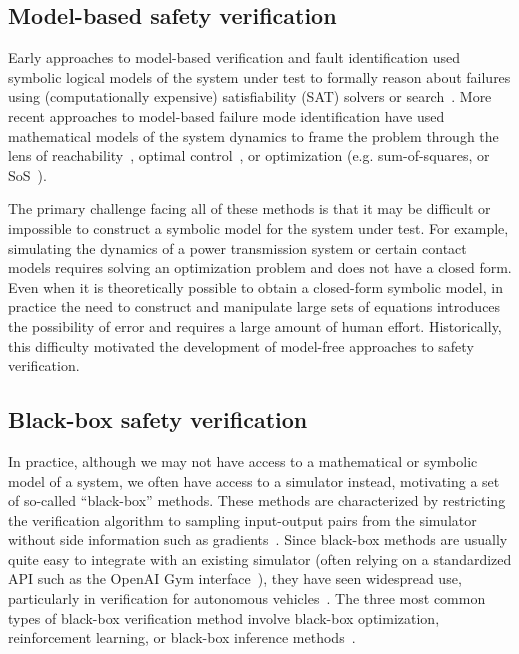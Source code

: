 \subsection{Model-based safety verification}

Early approaches to model-based verification and fault identification used symbolic logical models of the system under test to formally reason about failures using (computationally expensive) satisfiability (SAT) solvers or search~\cite{dekleerDiagnosingMultipleFaults1987,benardRemoteAgentExperiment2000}. More recent approaches to model-based failure mode identification have used mathematical models of the system dynamics to frame the problem through the lens of reachability~\cite{annpureddySTaLiRoToolTemporal2011,bansalHamiltonJacobiReachabilityBrief2017}, optimal control~\cite{chouUsingControlSynthesis2018}, or optimization (e.g. sum-of-squares, or SoS~\cite{ahmadiApplicationsPolynomialOptimization2016,majumdarControlVerificationHighdimensional2014}).

The primary challenge facing all of these methods is that it may be difficult or impossible to construct a symbolic model for the system under test. For example, simulating the dynamics of a power transmission system or certain contact models requires solving an optimization problem and does not have a closed form. Even when it is theoretically possible to obtain a closed-form symbolic model, in practice the need to construct and manipulate large sets of equations introduces the possibility of error and requires a large amount of human effort. Historically, this difficulty motivated the development of model-free approaches to safety verification.

\subsection{Black-box safety verification}

In practice, although we may not have access to a mathematical or symbolic model of a system, we often have access to a simulator instead, motivating a set of so-called ``black-box'' methods. These methods are characterized by restricting the verification algorithm to sampling input-output pairs from the simulator without side information such as gradients~\cite{corsoSurveyAlgorithmsBlackBox2021}. Since black-box methods are usually quite easy to integrate with an existing simulator (often relying on a standardized API such as the OpenAI Gym interface~\cite{brockmanOpenAIGym2016}), they have seen widespread use, particularly in verification for autonomous vehicles~\cite{xuSafeBenchBenchmarkingPlatform2022,riedmaierSurveyScenarioBasedSafety2020,okellyScalableEndtoEndAutonomous2018,corsoAdaptiveStressTesting2019,wangAdvSimGeneratingSafetyCritical2021,sunCornerCaseGeneration2021,zhongGuidedConditionalDiffusion2022,corsoInterpretableSafetyValidation2020a,zhangAdversarialRobustnessTrajectory2022,hanselmannKINGGeneratingSafetyCritical2022a}. The three most common types of black-box verification method involve black-box optimization, reinforcement learning, or black-box inference methods~\cite{corsoSurveyAlgorithmsBlackBox2021}.

